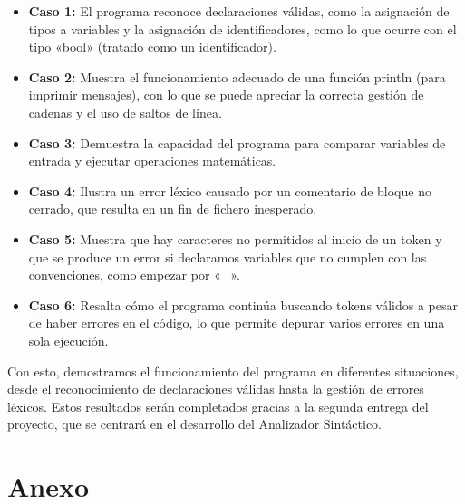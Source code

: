 \documentclass{article}
\begin{document}
\begin{itemize}
    \item \textbf{Caso 1:} El programa reconoce declaraciones válidas, como la asignación de tipos a variables y la asignación de identificadores, como lo que ocurre con el tipo «bool» (tratado como un identificador).
    
    \item \textbf{Caso 2:} Muestra el funcionamiento adecuado de una función println (para imprimir mensajes), con lo que se puede apreciar la correcta gestión de cadenas y el uso de saltos de línea.
    
    \item \textbf{Caso 3:} Demuestra la capacidad del programa para comparar variables de entrada y ejecutar operaciones matemáticas.
    
    \item \textbf{Caso 4:} Ilustra un error léxico causado por un comentario de bloque no cerrado, que resulta en un fin de fichero inesperado.
    
    \item \textbf{Caso 5:} Muestra que hay caracteres no permitidos al inicio de un token y que se produce un error si declaramos variables que no cumplen con las convenciones, como empezar por «\_».
    
    \item \textbf{Caso 6:} Resalta cómo el programa continúa buscando tokens válidos a pesar de haber errores en el código, lo que permite depurar varios errores en una sola ejecución.
\end{itemize}

Con esto, demostramos el funcionamiento del programa en diferentes situaciones, desde el reconocimiento de declaraciones válidas hasta la gestión de errores léxicos. Estos resultados serán completados gracias a la segunda entrega del proyecto, que se centrará en el desarrollo del Analizador Sintáctico.

\appendix
\section*{Anexo}

\end{document}
